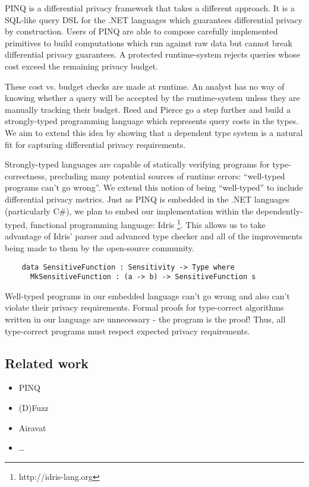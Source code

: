 \documentclass[12pt]{article}
\begin{document}
PINQ\cite{conf/sigmod/McSherry09} is a differential privacy framework that takes a different approach.
It is a SQL-like query DSL for the .NET languages which guarantees differential privacy by construction.
Users of PINQ are able to compose carefully implemented primitives to build computations which run against raw data but cannot break differential privacy guarantees.
A protected runtime-system rejects queries whose cost exceed the remaining privacy budget.

These cost vs. budget checks are made at runtime.
An analyst has no way of knowing whether a query will be accepted by the runtime-system unless they are manually tracking their budget.
Reed and Pierce\cite{conf/icfp/ReedP10} go a step further and build a strongly-typed programming language which represents query costs in the types.
We aim to extend this idea by showing that a dependent type system is a natural fit for capturing differential privacy requirements.

Strongly-typed languages are capable of statically verifying programs for type-correctness, precluding many potential sources of runtime errors: ``well-typed programs can't go wrong''.
We extend this notion of being ``well-typed'' to include differential privacy metrics.
Just as PINQ is embedded in the .NET languages (particularly C\#), we plan to embed our implementation within the dependently-typed, functional programming language: Idris \footnote{http://idris-lang.org}.
This allows us to take advantage of Idris' parser and advanced type checker and all of the improvements being made to them by the open-source community.

\begin{lstlisting}
    data SensitiveFunction : Sensitivity -> Type where
      MkSensitiveFunction : (a -> b) -> SensitiveFunction s
\end{lstlisting}

Well-typed programs in our embedded language can't go wrong and also can't violate their privacy requirements.
Formal proofs for type-correct algorithms written in our language are unnecessary - the program is the proof!
Thus, all type-correct programs must respect expected privacy requirements.

\subsection{Related work}

\begin{itemize}
  \item PINQ
  \item (D)Fuzz
  \item Airavat
  \item \ldots
\end{itemize}
\end{document}
